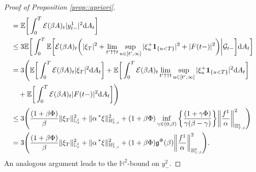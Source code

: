 \documentclass[10pt]{article} %
\newcommand\cE{\mathcal E}
\newcommand\cG{\mathcal G}
\newcommand{\smalltext}[1]{\text{\fontsize{4}{4}\selectfont$#1$}}
\newcommand\fg{\mathfrak g}
\def \E{\mathbb{E}}
\def \H{\mathbb{H}}
\def \L{\mathbb{L}}
\newcommand{\brs}[1]{\prescript{\ast}{}{#1}}
\newcommand{\1}{\mathbf{1}}
\def\d{\mathrm{d}}
\begin{document}
\begin{proof}[Proof of Proposition \ref{prop::apriori}]
\begin{align*}
	&= \E \bigg[ \int_0^T \cE(\beta A)_t |y^1_{t-}|^2 \d A_t \bigg] \\
	&\leq 3\E\bigg[ \int_0^T \E \bigg[\cE(\beta A)_t\bigg(|\xi_T|^2 +\lim_{t^\prime \uparrow\uparrow t}\sup_{u \in [t^\prime,\infty]}|\xi^+_u \mathbf{1}_{\{u < T\}}|^2 +  |F(t-)|^2\bigg) \bigg| \cG_{t-} \bigg] \d A_t \bigg] \\
	&= 3\Bigg(\E \bigg[ \int_0^T \cE(\beta A)_t |\xi_T|^2 \d A_t \bigg] + \E \bigg[ \int_0^T \cE(\beta A)_t \lim_{t^\prime \uparrow\uparrow t}\sup_{u \in [t^\prime,\infty]}|\xi^+_u \mathbf{1}_{\{u < T\}}|^2 \d A_t \bigg] \\
	&\quad+ \E \bigg[ \int_0^T \cE(\beta A)_t |F(t-)|^2 \d A_t \bigg] \Bigg) \\
	&\leq 3 \Bigg( \frac{(1+\beta\Phi)}{\beta} \|\xi_T\|^2_{\L^\smalltext{2}_\smalltext{\beta}} + \|\alpha\brs{\xi}\|^2_{\H^\smalltext{2}_{\smalltext{T}\smalltext{,}\smalltext{\beta}}} +  (1+\beta\Phi) \inf_{\gamma \in (0,\beta)}\bigg\{\frac{(1+\gamma\Phi)}{\gamma(\beta-\gamma)}\bigg\} \bigg\| \frac{f^1}{\alpha} \bigg\|^2_{\H^{\smalltext{2}}_{\smalltext{T}\smalltext{,}\smalltext{\beta}}} \Bigg) \\
	&= 3 \Bigg( \frac{(1+\beta\Phi)}{\beta} \|\xi_T\|^2_{\L^\smalltext{2}_\smalltext{\beta}} + \|\alpha\brs{\xi}\|^2_{\H^\smalltext{2}_{\smalltext{T}\smalltext{,}\smalltext{\beta}}} +  (1+\beta\Phi) \fg^\Phi(\beta) \bigg\| \frac{f^1}{\alpha} \bigg\|^2_{\H^{\smalltext{2}}_{\smalltext{T}\smalltext{,}\smalltext{\beta}}} \Bigg).
\end{align*}
An analogous argument leads to the $\H^2$-bound on $y^2_-$. 


\end{proof}
\end{document}
